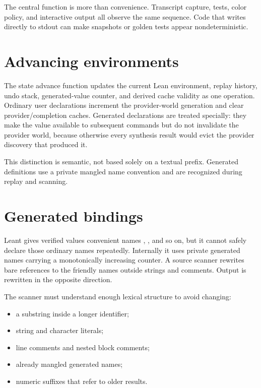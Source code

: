 \documentclass[10pt,letterpaper,oneside]{report}
\newcommand{\code}[1]{\texttt{\detokenize{#1}}}
\begin{document}
The central \code{emit} function is more than convenience. Transcript capture, tests, color policy, and interactive output all observe the same sequence. Code that writes directly to stdout can make snapshots or golden tests appear nondeterministic.

\section{Advancing environments}

The state advance function updates the current Lean environment, replay history, undo stack, generated-value counter, and derived cache validity as one operation. Ordinary user declarations increment the provider-world generation and clear provider/completion caches. Generated \code{it} declarations are treated specially: they make the value available to subsequent commands but do not invalidate the provider world, because otherwise every synthesis result would evict the provider discovery that produced it.

This distinction is semantic, not based solely on a textual prefix. Generated definitions use a private mangled name convention and are recognized during replay and scanning.

\section{Generated \code{it} bindings}\label{sec:leant-it}

Leant gives verified values convenient names \code{it}, \code{it1}, and so on, but it cannot safely declare those ordinary names repeatedly. Internally it uses private generated names carrying a monotonically increasing counter. A source scanner rewrites bare references to the friendly names outside strings and comments. Output is rewritten in the opposite direction.

The scanner must understand enough lexical structure to avoid changing:

\begin{itemize}
  \item a substring inside a longer identifier;
  \item string and character literals;
  \item line comments and nested block comments;
  \item already mangled generated names;
  \item numeric suffixes that refer to older results.
\end{itemize}
\end{document}
